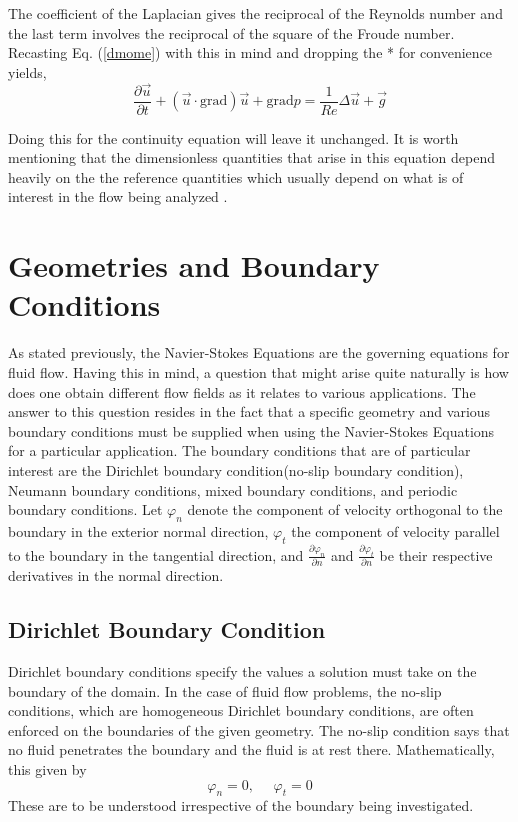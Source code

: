 The coefficient of the Laplacian gives the reciprocal of the Reynolds number and the last term involves the reciprocal of the square of the Froude number. Recasting Eq. (\ref{dmome}) with this in mind and dropping the * for  convenience yields, \begin{equation} \frac{\partial \stackrel{\rightarrow}{u}}{\partial t} + (\stackrel{\rightarrow}{u} \cdot \mbox{grad})\stackrel{\rightarrow}{u} + \mbox{grad} p = \frac{1}{Re} \Delta \stackrel{\rightarrow}{u} + \stackrel{\rightarrow}{g} \end{equation}

Doing this for the continuity equation will leave it unchanged. It is worth mentioning that the dimensionless quantities that arise in this equation depend heavily on the the reference quantities which usually depend on what is of interest in the flow being analyzed \cite{ffm}. 

\section{Geometries and Boundary Conditions}

As stated previously, the Navier-Stokes Equations are the governing equations for fluid flow. Having this in mind, a question that might arise quite naturally is how does one obtain different flow fields as it relates to various applications. The answer to this question resides in the fact that a specific geometry and various boundary conditions must be supplied when using the Navier-Stokes Equations for a particular application. The boundary conditions that are of particular interest are the Dirichlet boundary condition(no-slip boundary condition), Neumann boundary conditions, mixed boundary conditions, and periodic boundary conditions. Let $\varphi_{n}$ denote the component of velocity orthogonal to the boundary in the exterior normal direction, $\varphi_{t}$ the component of velocity parallel to the boundary in the tangential direction, and $ \displaystyle{\frac{\partial \varphi_{n}}{\partial n}}$ and $ \displaystyle{\frac{\partial \varphi_{t}}{\partial n}}$ be their respective derivatives in the normal direction. 

\subsection{Dirichlet Boundary Condition}

Dirichlet boundary conditions specify the values a solution must take on the boundary of the domain. In the case of fluid flow problems, the no-slip conditions, which are homogeneous Dirichlet boundary conditions, are often enforced on the boundaries of the given geometry. The no-slip condition says that no fluid penetrates the boundary and the fluid is at rest there. Mathematically, this given by \begin{equation} \varphi_{n} = 0, \ \ \ \ \ \  \varphi_{t} = 0 \end{equation} These are to be understood irrespective of the boundary being investigated.

